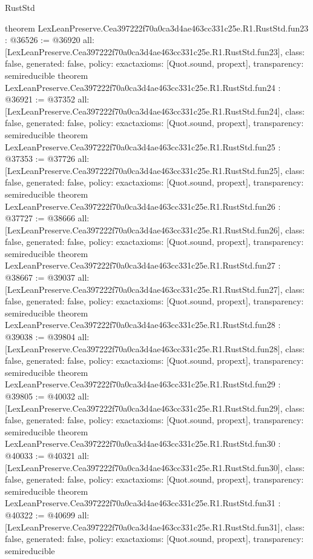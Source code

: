 \begin{lexlean}{RustStd}
\begin{coremodule}
{}
theorem LexLeanPreserve.Cea397222f70a0ca3d4ae463cc331c25e.R1.RustStd.fun23 : @36526 := @36920 {
  all: [LexLeanPreserve.Cea397222f70a0ca3d4ae463cc331c25e.R1.RustStd.fun23],
  class: false,
  generated: false,
  policy: exact{axioms: [Quot.sound, propext]},
  transparency: semireducible
}
theorem LexLeanPreserve.Cea397222f70a0ca3d4ae463cc331c25e.R1.RustStd.fun24 : @36921 := @37352 {
  all: [LexLeanPreserve.Cea397222f70a0ca3d4ae463cc331c25e.R1.RustStd.fun24],
  class: false,
  generated: false,
  policy: exact{axioms: [Quot.sound, propext]},
  transparency: semireducible
}
theorem LexLeanPreserve.Cea397222f70a0ca3d4ae463cc331c25e.R1.RustStd.fun25 : @37353 := @37726 {
  all: [LexLeanPreserve.Cea397222f70a0ca3d4ae463cc331c25e.R1.RustStd.fun25],
  class: false,
  generated: false,
  policy: exact{axioms: [Quot.sound, propext]},
  transparency: semireducible
}
theorem LexLeanPreserve.Cea397222f70a0ca3d4ae463cc331c25e.R1.RustStd.fun26 : @37727 := @38666 {
  all: [LexLeanPreserve.Cea397222f70a0ca3d4ae463cc331c25e.R1.RustStd.fun26],
  class: false,
  generated: false,
  policy: exact{axioms: [Quot.sound, propext]},
  transparency: semireducible
}
theorem LexLeanPreserve.Cea397222f70a0ca3d4ae463cc331c25e.R1.RustStd.fun27 : @38667 := @39037 {
  all: [LexLeanPreserve.Cea397222f70a0ca3d4ae463cc331c25e.R1.RustStd.fun27],
  class: false,
  generated: false,
  policy: exact{axioms: [Quot.sound, propext]},
  transparency: semireducible
}
theorem LexLeanPreserve.Cea397222f70a0ca3d4ae463cc331c25e.R1.RustStd.fun28 : @39038 := @39804 {
  all: [LexLeanPreserve.Cea397222f70a0ca3d4ae463cc331c25e.R1.RustStd.fun28],
  class: false,
  generated: false,
  policy: exact{axioms: [Quot.sound, propext]},
  transparency: semireducible
}
theorem LexLeanPreserve.Cea397222f70a0ca3d4ae463cc331c25e.R1.RustStd.fun29 : @39805 := @40032 {
  all: [LexLeanPreserve.Cea397222f70a0ca3d4ae463cc331c25e.R1.RustStd.fun29],
  class: false,
  generated: false,
  policy: exact{axioms: [Quot.sound, propext]},
  transparency: semireducible
}
theorem LexLeanPreserve.Cea397222f70a0ca3d4ae463cc331c25e.R1.RustStd.fun30 : @40033 := @40321 {
  all: [LexLeanPreserve.Cea397222f70a0ca3d4ae463cc331c25e.R1.RustStd.fun30],
  class: false,
  generated: false,
  policy: exact{axioms: [Quot.sound, propext]},
  transparency: semireducible
}
theorem LexLeanPreserve.Cea397222f70a0ca3d4ae463cc331c25e.R1.RustStd.fun31 : @40322 := @40699 {
  all: [LexLeanPreserve.Cea397222f70a0ca3d4ae463cc331c25e.R1.RustStd.fun31],
  class: false,
  generated: false,
  policy: exact{axioms: [Quot.sound, propext]},
  transparency: semireducible
}
\end{coremodule}
\end{lexlean}
